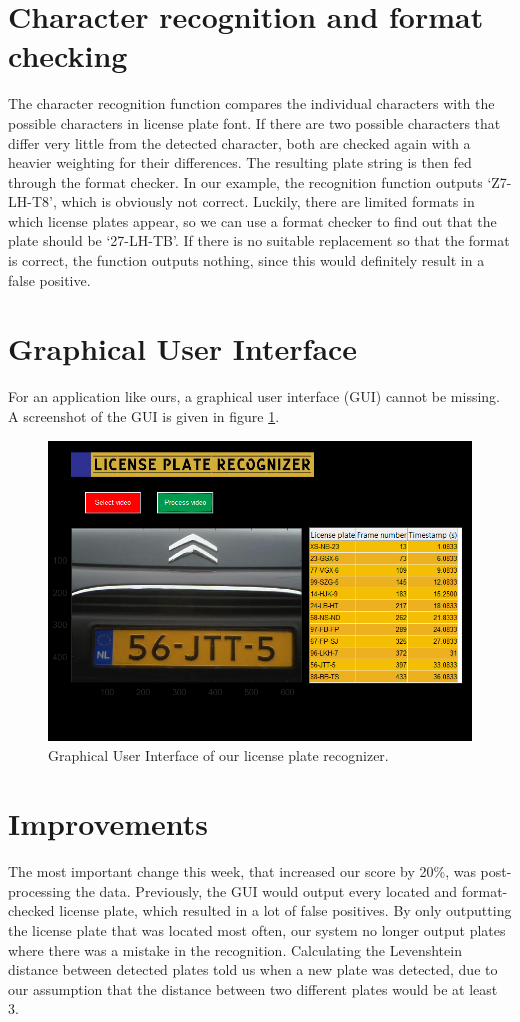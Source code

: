 \documentclass{tudelftposter}
\begin{document}
\section{Character recognition and format checking}
The character recognition function compares the individual characters with the possible characters in license plate font. If there are two possible characters that differ very little from the detected character, both are checked again with a heavier weighting for their differences. The resulting plate string is then fed through the format checker. In our example, the recognition function outputs `Z7-LH-T8', which is obviously not correct. Luckily, there are limited formats in which license plates appear, so we can use a format checker to find out that the plate should be `27-LH-TB'. If there is no suitable replacement so that the format is correct, the function outputs nothing, since this would definitely result in a false positive. 

\section{Graphical User Interface}
For an application like ours, a graphical user interface (GUI)
cannot be missing. A screenshot of the GUI is given in figure
\ref{gui}.

\begin{figure}[h]
	\centering
	\includegraphics[width=800pt]{gui2.png}
	\caption{Graphical User Interface of our license plate recognizer.}
	\label{gui}
\end{figure}

\section{Improvements}
The most important change this week, that increased our score by 20\%, was post-processing the data. Previously, the GUI would output every located and format-checked license plate, which resulted in a lot of false positives. By only outputting the license plate that was located most often, our system no longer output plates where there was a mistake in the recognition. Calculating the Levenshtein distance between detected plates told us when a new plate was detected, due to our assumption that the distance between two different plates would be at least 3. 
\end{document}
